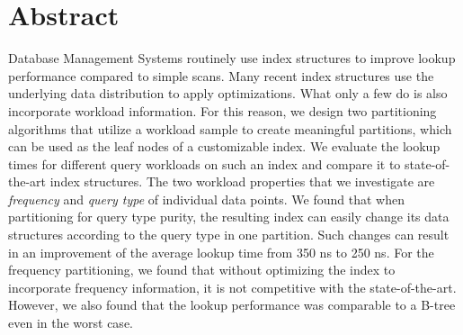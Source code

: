 \thispagestyle{plain}

\chapter*{Abstract}
Database Management Systems routinely use index structures to improve lookup performance compared to simple scans. Many recent index structures use the underlying data distribution to apply optimizations. What only a few do is also incorporate workload information. For this reason, we design two partitioning algorithms that utilize a workload sample to create meaningful partitions, which can be used as the leaf nodes of a customizable index. We evaluate the lookup times for different query workloads on such an index and compare it to state-of-the-art index structures. The two workload properties that we investigate are \textit{frequency} and \textit{query type} of individual data points. We found that when partitioning for query type purity, the resulting index can easily change its data structures according to the query type in one partition. Such changes can result in an improvement of the average lookup time from 350 ns to 250 ns. For the frequency partitioning, we found that without optimizing the index to incorporate frequency information, it is not competitive with the state-of-the-art. However, we also found that the lookup performance was comparable to a B-tree even in the worst case.